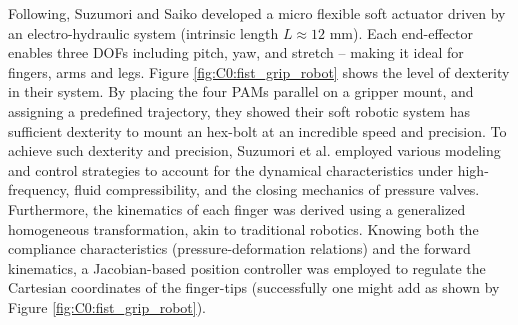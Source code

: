 Following, Suzumori and Saiko \cite{Suzumori1991,Suzumori1992} developed a micro flexible soft actuator driven by an electro-hydraulic system (intrinsic length $L \approx12$ \si{\milli \meter}). Each end-effector enables three DOFs including pitch, yaw, and stretch -- making it ideal for fingers, arms and legs. Figure \ref{fig:C0:fist_grip_robot} shows the level of dexterity in their system. By placing the four PAMs parallel on a gripper mount, and assigning a predefined trajectory, they showed their soft robotic system has sufficient dexterity to mount an hex-bolt at an incredible speed and precision. To achieve such dexterity and precision, Suzumori et al. \cite{Suzumori1991} employed various modeling and control strategies to account for the dynamical characteristics under high-frequency, fluid compressibility, and the closing mechanics of pressure valves. Furthermore, the kinematics of each finger was derived using a generalized homogeneous transformation, akin to traditional robotics. Knowing both the compliance characteristics (pressure-deformation relations) and the forward kinematics, a Jacobian-based position controller was employed to regulate the Cartesian coordinates of the finger-tips (successfully one might add as shown by Figure \ref{fig:C0:fist_grip_robot}). \\[0.1em]
%
